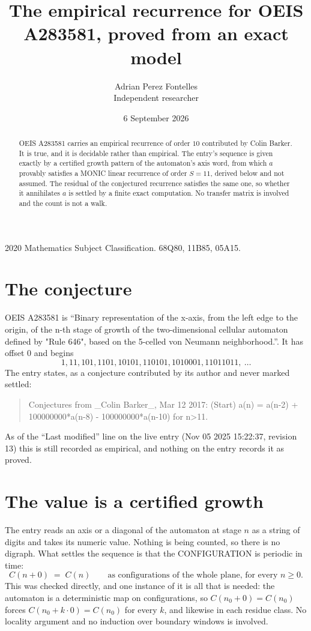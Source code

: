\documentclass[11pt,a4paper]{article}
\title{The empirical recurrence for OEIS A283581, proved from an exact model}
\author{Adrian Perez Fontelles\\ \small Independent researcher}
\date{6 September 2026}
\theoremstyle{plain}
\theoremstyle{definition}
\begin{document}
\maketitle

\begin{abstract}
OEIS A283581 carries an empirical recurrence of order $10$ contributed by Colin Barker. It is true, and it is
decidable rather than empirical. The entry's sequence is given exactly by a certified growth pattern of the automaton's axis word, from
which $a$ provably satisfies a MONIC linear recurrence of order $S=11$, derived below and not
assumed. The residual of the conjectured recurrence satisfies the same one, so whether it
annihilates $a$ is settled by a finite exact computation. No transfer matrix is involved and
the count is not a walk.
\end{abstract}

\noindent\small 2020 Mathematics Subject Classification. 68Q80, 11B85, 05A15.\normalsize

\section{The conjecture}

OEIS A283581 is ``Binary representation of the x-axis, from the left edge to the origin, of the n-th stage of growth of the two-dimensional cellular automaton defined by "Rule 646", based on the 5-celled von Neumann neighborhood.''. It has offset $0$ and begins
\[
1, 11, 101, 1101, 10101, 110101, 1010001, 11011011,\ \dots
\]
The entry states, as a conjecture contributed by its author and never marked settled:
\begin{quote}
Conjectures from \_Colin Barker\_, Mar 12 2017: (Start) a(n) = a(n-2) + 100000000*a(n-8) - 100000000*a(n-10) for n>11.
\end{quote}
As of the ``Last modified'' line on the live entry (Nov 05 2025 15:22:37, revision 13)
this is still recorded as empirical, and nothing on the entry records it as proved.

\section{The value is a certified growth}

The entry reads an axis or a diagonal of the automaton at stage $n$ as a string of digits and
takes its numeric value. Nothing is being counted, so there is no digraph. What settles the
sequence is that the CONFIGURATION is periodic in time:
\[
C(n+0)\;=\;C(n)\qquad\text{as configurations of the whole plane, for every } n\ge 0.
\]
This was checked directly, and one instance of it is all that is needed: the automaton is a
deterministic map on configurations, so $C(n_0+0)=C(n_0)$ forces $C(n_0+k\cdot0)=C(n_0)$ for
every $k$, and likewise in each residue class. No locality argument and no induction over
boundary windows is involved.
\end{document}
